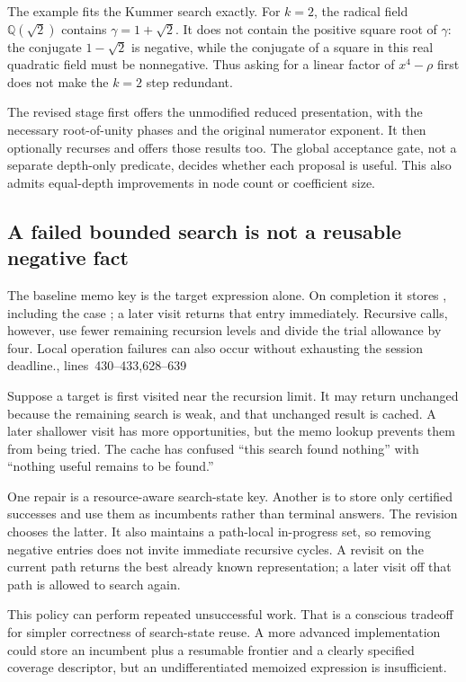 \documentclass[11pt,a4paper]{article}
\newcommand{\Q}{\mathbb Q}\newcommand{\C}{\mathbb C}
\newcommand{\code}[1]{\texttt{\detokenize{#1}}}
\newcommand{\src}[1]{\cite{source}, lines~#1}
\theoremstyle{definition}\newtheorem{definition}[proposition]{Definition}
\theoremstyle{remark}\newtheorem{remark}[proposition]{Remark}
\begin{document}
The example fits the Kummer search exactly. For $k=2$, the radical field
$\Q(\sqrt2)$ contains $\gamma=1+\sqrt2$. It does not contain the positive square
root of $\gamma$: the conjugate $1-\sqrt2$ is negative, while the conjugate of a
square in this real quadratic field must be nonnegative. Thus asking for a
linear factor of $x^4-\rho$ first does not make the $k=2$ step redundant.

The revised stage first offers the unmodified reduced presentation, with the
necessary root-of-unity phases and the original numerator exponent. It then
optionally recurses and offers those results too. The global acceptance gate,
not a separate depth-only predicate, decides whether each proposal is useful.
This also admits equal-depth improvements in node count or coefficient size.

\subsection{A failed bounded search is not a reusable negative fact}
The baseline memo key is the target expression alone. On completion it stores
\code{best}, including the case \code{best === target}; a later visit returns
that entry immediately. Recursive calls, however, use fewer remaining recursion
levels and divide the trial allowance by four. Local operation failures can
also occur without exhausting the session deadline.\src{430--433,628--639}

Suppose a target is first visited near the recursion limit. It may return
unchanged because the remaining search is weak, and that unchanged result is
cached. A later shallower visit has more opportunities, but the memo lookup
prevents them from being tried. The cache has confused ``this search found
nothing'' with ``nothing useful remains to be found.''

One repair is a resource-aware search-state key. Another is to store only
certified successes and use them as incumbents rather than terminal answers.
The revision chooses the latter. It also maintains a path-local in-progress
set, so removing negative entries does not invite immediate recursive cycles.
A revisit on the current path returns the best already known representation;
a later visit off that path is allowed to search again.

This policy can perform repeated unsuccessful work. That is a conscious tradeoff
for simpler correctness of search-state reuse. A more advanced implementation
could store an incumbent plus a resumable frontier and a clearly specified
coverage descriptor, but an undifferentiated memoized expression is insufficient.
\end{document}
